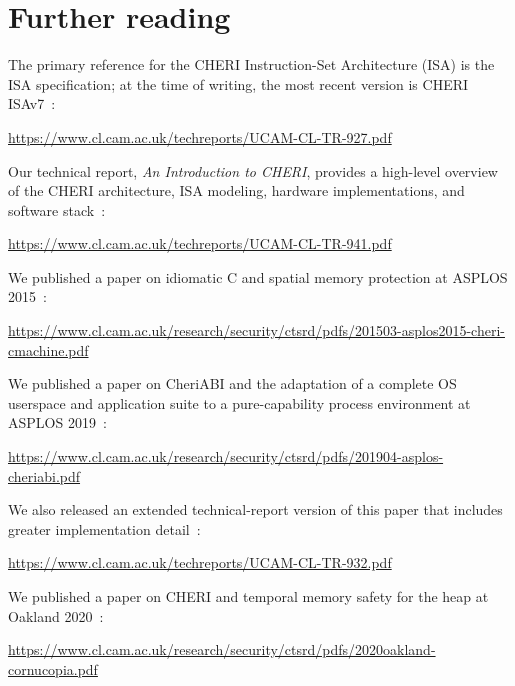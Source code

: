 \documentclass[12pt,twoside,openright,usletter]{article}
\newcommand{\note}[2]{{\color{blue}[ Note: #1 - #2]}}
\renewcommand{\note}[2]{\relax\ifhmode\unskip\fi}
\newcommand{\arnote}[1]{\note{#1}{Alex R.}}
\begin{document}
\arnote{\subsection{TODO: more warnings}}


\section{Further reading}
\label{sec:further_reading}

The primary reference for the CHERI Instruction-Set Architecture (ISA) is the
ISA specification; at the time of writing, the most recent version is CHERI
ISAv7~\cite{UCAM-CL-TR-927}:

\smallskip
\noindent
\url{https://www.cl.cam.ac.uk/techreports/UCAM-CL-TR-927.pdf}
\smallskip

\noindent
Our technical report, \textit{An Introduction to CHERI}, provides a high-level
overview of the CHERI architecture, ISA modeling, hardware implementations,
and software stack~\cite{UCAM-CL-TR-941}:

\smallskip
\noindent
\url{https://www.cl.cam.ac.uk/techreports/UCAM-CL-TR-941.pdf}
\smallskip

\noindent
We published a paper on idiomatic C and spatial memory protection at ASPLOS
2015~\cite{ChisnallCPDP11}:

\smallskip
\noindent
\url{https://www.cl.cam.ac.uk/research/security/ctsrd/pdfs/201503-asplos2015-cheri-cmachine.pdf}
\smallskip

\noindent
We published a paper on CheriABI and the adaptation of a complete OS userspace
and application suite to a pure-capability process environment at ASPLOS
2019~\cite{davis2019:cheriabi}:

\smallskip
\noindent
\url{https://www.cl.cam.ac.uk/research/security/ctsrd/pdfs/201904-asplos-cheriabi.pdf}
\smallskip

\noindent
We also released an extended technical-report version of this paper that
includes greater implementation detail~\cite{UCAM-CL-TR-932}:

\smallskip
\noindent
\url{https://www.cl.cam.ac.uk/techreports/UCAM-CL-TR-932.pdf}
\smallskip

\noindent
We published a paper on CHERI and temporal memory safety for the heap at
Oakland 2020~\cite{filardo:cornucopia}:

\smallskip
\noindent
\url{https://www.cl.cam.ac.uk/research/security/ctsrd/pdfs/2020oakland-cornucopia.pdf}
\smallskip
\end{document}
